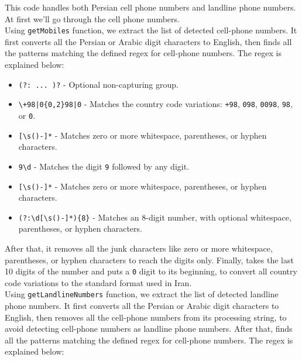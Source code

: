 \documentclass{solutionclass} %
\def\co#1{\texttt{#1}}
\begin{document}
\begin{solution}
This code handles both Persian cell phone numbers and landline phone numbers. At first we'll go through the cell phone numbers.\\
 
Using \co{getMobiles} function, we extract the list of detected cell-phone numbers. It first converts all the Persian or Arabic digit characters to English, then finds all the patterns matching the defined regex for cell-phone numbers. The regex is explained below: 

  \begin{itemize}
    \item \texttt{(?: ... )?} - Optional non-capturing group.
    \item \texttt{\textbackslash+98|0\{0,2\}98|0} - Matches the country code variations: \texttt{+98}, \texttt{098}, \texttt{0098}, \texttt{98}, or \texttt{0}.
    \item \texttt{[\textbackslash s()-]*} - Matches zero or more whitespace, parentheses, or hyphen characters.
    \item \texttt{9\textbackslash d} - Matches the digit \texttt{9} followed by any digit.
    \item \texttt{[\textbackslash s()-]*} - Matches zero or more whitespace, parentheses, or hyphen characters.
    \item \texttt{(?:\textbackslash d[\textbackslash s()-]*)\{8\}} - Matches an 8-digit number, with optional whitespace, parentheses, or hyphen characters.
  \end{itemize}
  
After that, it removes all the junk characters like zero or more whitespace, parentheses, or hyphen characters to reach the digits only. Finally, takes the last 10 digits of the number and puts a \co{0} digit to its beginning, to convert all country code variations to the standard format used in Iran.\\

Using \co{getLandlineNumbers} function, we extract the list of detected landline phone numbers. It first converts all the Persian or Arabic digit characters to English, then removes all the cell-phone numbers from its processing string, to avoid detecting cell-phone numbers as landline phone numbers. After that, finds all the patterns matching the defined regex for cell-phone numbers. The regex is explained below:


\end{solution}
\end{document}
